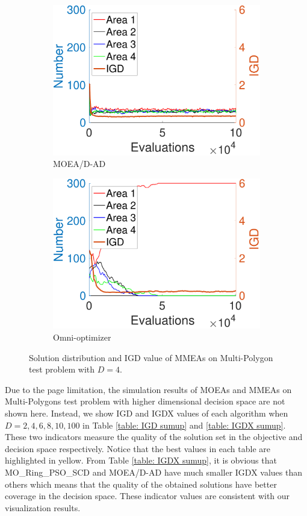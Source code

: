 \documentclass[conference]{IEEEtran}
\begin{document}
\begin{figure}[htbp]
    \begin{subfigure}[b]{.24\textwidth}
    \includegraphics[width=\linewidth]{Section5/dim4/Diversity/MOEADAD}
    \caption{MOEA/D-AD}
    \end{subfigure}
    \begin{subfigure}[b]{.24\textwidth}
    \includegraphics[width=\linewidth]{Section5/dim4/Diversity/OmniOptimizer}
    \caption{Omni-optimizer}
    \end{subfigure}
    \caption{Solution distribution and IGD value of MMEAs on Multi-Polygon test problem with $D=4$.}
    \label{fig: MMEAs Diversity dim=4}
\end{figure}

Due to the page limitation, the simulation results of MOEAs and MMEAs on Multi-Polygons test problem with higher dimensional decision space are not shown here. Instead, we show IGD and IGDX\cite{liang2016multimodal} values of each algorithm when $D=2, 4, 6, 8, 10, 100$ in Table \ref{table: IGD sumup} and \ref{table: IGDX sumup}. These two indicators measure the quality of the solution set in the objective and decision space respectively. Notice that the best values in each table are highlighted in yellow. From Table \ref{table: IGDX sumup}, it is obvious that MO\_Ring\_PSO\_SCD and MOEA/D-AD have much smaller IGDX values than others which means that the quality of the obtained solutions have better coverage in the decision space. These indicator values are consistent with our visualization results.
\end{document}
